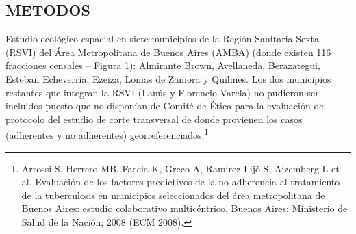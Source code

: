 \begin{multicols}{2}
\section*{METODOS}
\par{}Estudio ecológico espacial en siete municipios de la Región Sanitaria Sexta (\allowbreak{}RSVI)\allowbreak{} del Área Metropolitana de Buenos Aires (\allowbreak{}AMBA)\allowbreak{} (\allowbreak{}donde existen 116 fracciones censales – Figura 1)\allowbreak{}:\allowbreak{} Almirante Brown,\allowbreak{} Avellaneda,\allowbreak{} Berazategui,\allowbreak{} Esteban Echeverría,\allowbreak{} Ezeiza,\allowbreak{} Lomas de Zamora y Quilmes.\allowbreak{} Los dos municipios restantes que integran la RSVI (\allowbreak{}Lanús y Florencio Varela)\allowbreak{} no pudieron ser incluidos puesto que no disponían de Comité de Ética para la evaluación del protocolo del estudio de corte transversal de donde provienen los casos (\allowbreak{}adherentes y no adherentes)\allowbreak{} georreferenciados.\allowbreak{}\protect\footnote{ Arrossi S,\allowbreak{} Herrero MB,\allowbreak{} Faccia K,\allowbreak{} Greco A,\allowbreak{} Ramirez Lijó S,\allowbreak{} Aizemberg L et al.\allowbreak{} Evaluación de los factores predictivos de la no-\allowbreak{}adherencia al tratamiento de la tuberculosis en municipios seleccionados del área metropolitana de Buenos Aires:\allowbreak{} estudio colaborativo multicéntrico.\allowbreak{} Buenos Aires:\allowbreak{} Ministerio de Salud de la Nación; 2008 (\allowbreak{}ECM 2008)\allowbreak{}.\allowbreak{}}\par{}
\par
{
}
\end{multicols}
